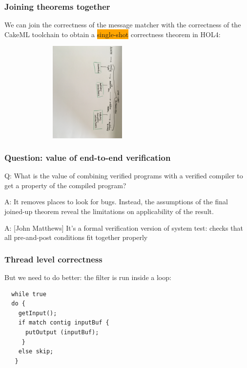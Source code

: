 \documentclass{beamer}
\newcommand{\kemph}[1]{\colorbox{orange}{#1}}
\begin{document}
\begin{frame}\frametitle{Joining theorems together}

  We can join the correctness of the message matcher with the
  correctness of the CakeML toolchain to obtain a \kemph{single-shot}
  correctness theorem in HOL4:
  \vspace*{5mm}

  \includegraphics[width=90mm,height=50mm]{one-shot.jpg}

\end{frame}

\begin{frame}\frametitle{Question: value of end-to-end verification}

Q: What is the value of combining verified programs with a verified
   compiler to get a property of the compiled program?

A: It removes places to look for bugs. Instead, the assumptions of the
final joined-up theorem reveal the limitations on applicability of the
result.

A: [John Matthews] It's a formal verification version of system test:
checks that all pre-and-post conditions fit together properly

\end{frame}


\begin{frame}[fragile]\frametitle{Thread level correctness}

But we need to do better: the filter is run inside a loop:

{\small
\begin{verbatim}
  while true
  do {
    getInput();
    if match contig inputBuf {
      putOutput (inputBuf);
     }
    else skip;
   }
\end{verbatim}
}
\end{frame}
\end{document}
